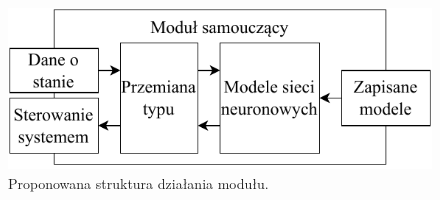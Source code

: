 \begin{figure}
    \centering\includegraphics[width=.55\textwidth]{img/architecture_module.pdf}
    \caption{Proponowana struktura działania modułu.} \label{fig:architektura_modułu}
\end{figure}


